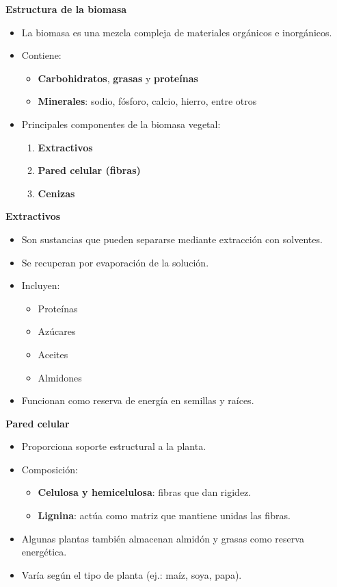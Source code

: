 \documentclass[../../main.tex]{subfiles}
\begin{document}
\begin{frame}{\textbf{Estructura de la biomasa}}
\begin{itemize}
  \item La biomasa es una mezcla compleja de materiales orgánicos e inorgánicos.
  \item Contiene:
  \begin{itemize}
    \item \textbf{Carbohidratos}, \textbf{grasas} y \textbf{proteínas}
    \item \textbf{Minerales}: sodio, fósforo, calcio, hierro, entre otros
  \end{itemize}
  \item Principales componentes de la biomasa vegetal:
  \begin{enumerate}
    \item \textbf{Extractivos}
    \item \textbf{Pared celular (fibras)}
    \item \textbf{Cenizas}
  \end{enumerate}
\end{itemize}
\end{frame}

\begin{frame}{\textbf{Extractivos}}
\begin{itemize}
  \item Son sustancias que pueden separarse mediante extracción con solventes.
  \item Se recuperan por evaporación de la solución.
  \item Incluyen:
  \begin{itemize}
    \item Proteínas
    \item Azúcares
    \item Aceites
    \item Almidones
  \end{itemize}
  \item Funcionan como reserva de energía en semillas y raíces.
\end{itemize}
\end{frame}

\begin{frame}{\textbf{Pared celular}}
\begin{itemize}
  \item Proporciona soporte estructural a la planta.
  \item Composición:
  \begin{itemize}
    \item \textbf{Celulosa y hemicelulosa}: fibras que dan rigidez.
    \item \textbf{Lignina}: actúa como matriz que mantiene unidas las fibras.
  \end{itemize}
  \item Algunas plantas también almacenan almidón y grasas como reserva energética.
  \item Varía según el tipo de planta (ej.: maíz, soya, papa).
\end{itemize}
\end{frame}
\end{document}
